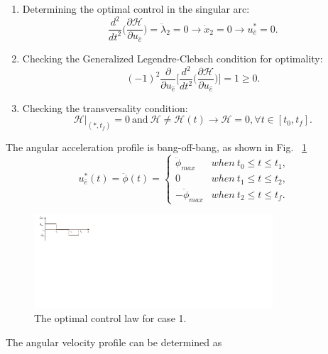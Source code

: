 \documentclass[journal ]{new-aiaa}
\begin{document}
\begin{enumerate}
		\item Determining the optimal control in the singular arc:
		\begin{equation}
		\frac{d^2}{dt^2}\Big(\frac{\partial \mathscr{H}}{\partial u_{\hat e}}\Big)=\ddot{\lambda}_2=0\rightarrow \dot{x}_2=0\rightarrow u_{\hat{e}}^*=0.
		\end{equation}
		\item Checking the Generalized Legendre-Clebsch condition for optimality:
		\begin{equation}
		(-1)^2\frac{\partial}{\partial u_{\hat{e}}}\Big[\frac{d^2}{dt^2}\Big(\frac{\partial \mathscr{H}}{\partial u_{\hat e}}\Big)\Big]=1\geq 0.
		\end{equation}
		\item Checking the transversality condition:
		\begin{equation}
		\mathscr{H}|_{(*,t_f)}=0\  \text{and} \ \mathscr{H}\neq\mathscr{H}(t)\rightarrow \mathscr{H}=0, \forall t\in[t_0, t_f].
		\end{equation}
	\end{enumerate}
	
	
	The angular acceleration profile is bang-off-bang, as shown in Fig. ~\ref{bang_off_bang}
	\begin{equation}\label{phidd_cons}
	u_{\hat e}^*(t)=\ddot{\phi}(t)=\left\{
	\begin{array}{ll}
	\ddot{\phi}_{max}& when\  t_0\leq t\leq t_1,\\
	0& when\  t_1\leq t \leq t_2,\\
	-\ddot{\phi}_{max}& when \ t_2\leq t\leq t_f.
	\end{array}
	\right.
	\end{equation}

	\begin{figure}[h!]
	\centering
	\includegraphics[width=3.5in]{bang_off_bang}
	\caption{The optimal control law for case 1.}
	\label{bang_off_bang}
	\end{figure}
 The angular velocity profile can be determined as
\end{document}
